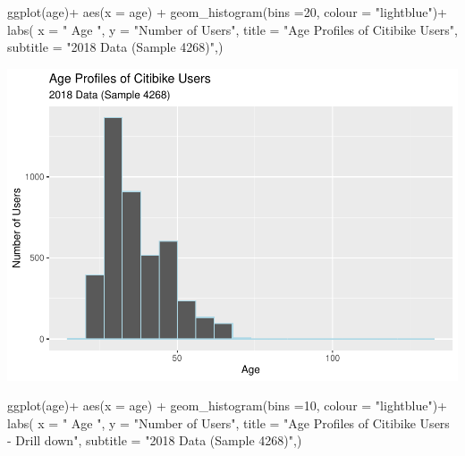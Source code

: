 \documentclass[
]{article}
\newenvironment{Shaded}{\begin{snugshade}}{\end{snugshade}}
\newcommand{\AttributeTok}[1]{\textcolor[rgb]{0.77,0.63,0.00}{#1}}
\newcommand{\DecValTok}[1]{\textcolor[rgb]{0.00,0.00,0.81}{#1}}
\newcommand{\FunctionTok}[1]{\textcolor[rgb]{0.00,0.00,0.00}{#1}}
\newcommand{\NormalTok}[1]{#1}
\newcommand{\SpecialCharTok}[1]{\textcolor[rgb]{0.00,0.00,0.00}{#1}}
\newcommand{\StringTok}[1]{\textcolor[rgb]{0.31,0.60,0.02}{#1}}
\begin{document}
\begin{Shaded}
\begin{Highlighting}[]
\FunctionTok{ggplot}\NormalTok{(age)}\SpecialCharTok{+}
  \FunctionTok{aes}\NormalTok{(}\AttributeTok{x =}\NormalTok{ age) }\SpecialCharTok{+}
  \FunctionTok{geom\_histogram}\NormalTok{(}\AttributeTok{bins =}\DecValTok{20}\NormalTok{, }\AttributeTok{colour =} \StringTok{"lightblue"}\NormalTok{)}\SpecialCharTok{+}
  \FunctionTok{labs}\NormalTok{(}
    \AttributeTok{x =} \StringTok{" Age "}\NormalTok{,}
    \AttributeTok{y =} \StringTok{"Number of Users"}\NormalTok{,}
    \AttributeTok{title =} \StringTok{"Age Profiles of Citibike Users"}\NormalTok{,}
    \AttributeTok{subtitle =} \StringTok{"2018 Data (Sample 4268)"}\NormalTok{,)}
\end{Highlighting}
\end{Shaded}

\includegraphics{nyc_bikes_presentation_janehogg_files/figure-latex/unnamed-chunk-8-1.pdf}

\begin{Shaded}
\begin{Highlighting}[]
\FunctionTok{ggplot}\NormalTok{(age)}\SpecialCharTok{+}
  \FunctionTok{aes}\NormalTok{(}\AttributeTok{x =}\NormalTok{ age) }\SpecialCharTok{+}
  \FunctionTok{geom\_histogram}\NormalTok{(}\AttributeTok{bins =}\DecValTok{10}\NormalTok{, }\AttributeTok{colour =} \StringTok{"lightblue"}\NormalTok{)}\SpecialCharTok{+}
  \FunctionTok{labs}\NormalTok{(}
    \AttributeTok{x =} \StringTok{" Age "}\NormalTok{,}
    \AttributeTok{y =} \StringTok{"Number of Users"}\NormalTok{,}
    \AttributeTok{title =} \StringTok{"Age Profiles of Citibike Users {-} Drill down"}\NormalTok{,}
    \AttributeTok{subtitle =} \StringTok{"2018 Data (Sample 4268)"}\NormalTok{,)}
\end{Highlighting}
\end{Shaded}
\end{document}
